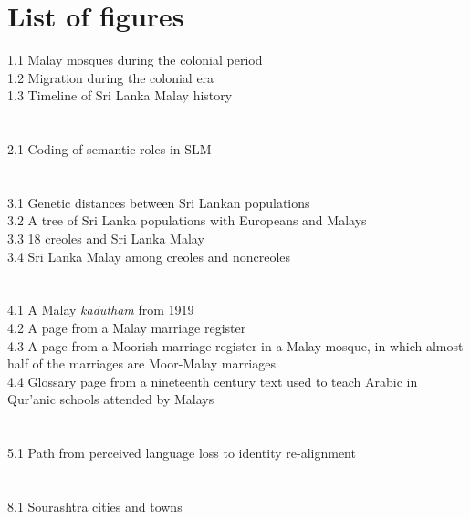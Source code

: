 \section*{List of figures}
1.1 Malay mosques during the colonial period\\
1.2 Migration during the colonial era\\
1.3 Timeline of Sri Lanka Malay history\\
\\\\
2.1 Coding of semantic roles in SLM\\
\\\\
3.1 Genetic distances between Sri Lankan populations\\
3.2 A tree of Sri Lanka populations with Europeans and Malays\\
3.3 18 creoles and Sri Lanka Malay\\
3.4 Sri Lanka Malay among creoles and noncreoles\\
\\\\
4.1 A Malay \textit{kadutham} from 1919\\
4.2 A page from a Malay marriage register\\
4.3 A page from a Moorish marriage register in a Malay mosque, in which almost half of the marriages are Moor-Malay marriages\\
4.4 Glossary page from a nineteenth century text used to teach Arabic in Qur'anic schools attended by Malays\\
\\\\
5.1 Path from perceived language loss to identity re-alignment\\
\\\\
8.1 Sourashtra cities and towns\\
\\\\